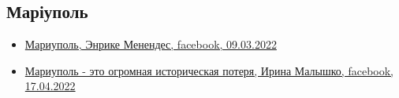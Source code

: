  
 
 
 
 

\subsection{Маріуполь}
\label{sec:topics.vojna.mariupol}

\begin{itemize} %

\item \hyperlink{09_03_2022.fb.menendes_enrike.1.mariupol}{%
Мариуполь, Энрике Менендес, facebook, 09.03.2022
}

\item \hyperlink{17_04_2022.fb.malyshko_irina.1.mariupol_muzej}{%
Мариуполь - это огромная историческая потеря, Ирина Малышко, facebook, 17.04.2022%
}

\end{itemize} %


